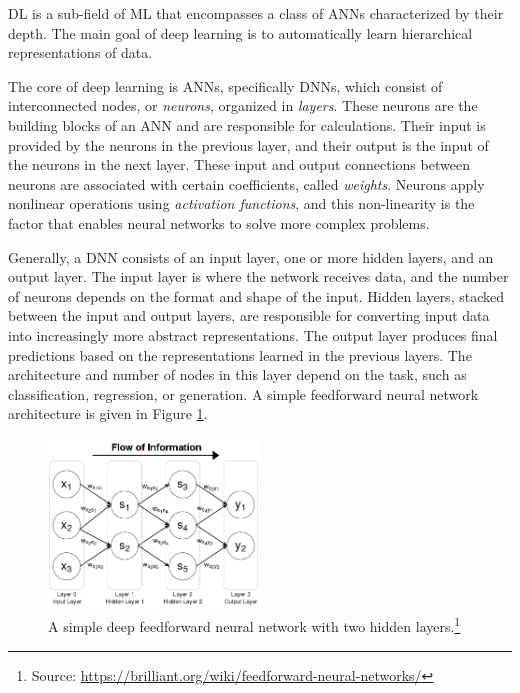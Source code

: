 \ac{DL} is a sub-field of \ac{ML} that encompasses a class of \ac{ANN}s characterized by their depth. The main goal of deep learning is to automatically learn hierarchical representations of data.

The core of deep learning is \ac{ANN}s, specifically \ac{DNN}s, which consist of interconnected nodes, or \textit{neurons}, organized in \textit{layers}. These neurons are the building blocks of an \ac{ANN} and are responsible for calculations. Their input is provided by the neurons in the previous layer, and their output is the input of the neurons in the next layer. These input and output connections between neurons are associated with certain coefficients, called \textit{weights}. Neurons apply nonlinear operations using \textit{activation functions}, and this non-linearity is the factor that enables neural networks to solve more complex problems.

Generally, a \ac{DNN} consists of an input layer, one or more hidden layers, and an output layer. The input layer is where the network receives data, and the number of neurons depends on the format and shape of the input. Hidden layers, stacked between the input and output layers, are responsible for converting input data into increasingly more abstract representations. The output layer produces final predictions based on the representations learned in the previous layers. The architecture and number of nodes in this layer depend on the task, such as classification, regression, or generation. A simple feedforward neural network architecture is given in Figure \ref{fig:feedforward}.


\begin{figure}[ht]
    \begin{minipage}{\textwidth}
        \centering
        \includegraphics[width=0.5\textwidth]{img/feedforward_NN.png}
        \caption[A simple deep feedforward neural network with two hidden layers.]{A simple deep feedforward neural network with two hidden layers.\footnote{Source: \url{https://brilliant.org/wiki/feedforward-neural-networks/}}}
        \label{fig:feedforward}
    \end{minipage}
\end{figure}

